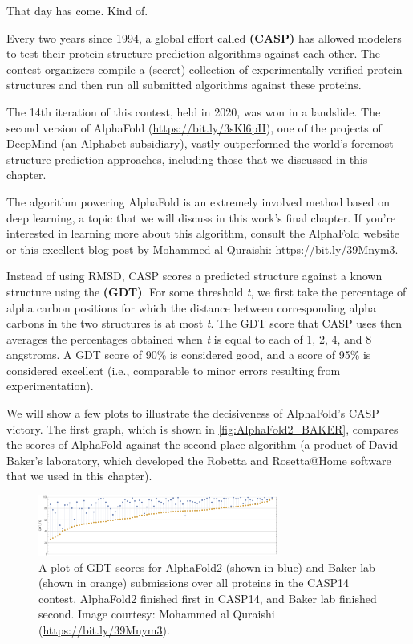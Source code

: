 That day has come. Kind of.

Every two years since 1994, a global effort called  \textbf{(CASP)} has allowed modelers to test their protein structure prediction algorithms against each other. The contest organizers compile a (secret) collection of experimentally verified protein structures and then run all submitted algorithms against these proteins.

The 14th iteration of this contest, held in 2020, was won in a landslide. The second version of AlphaFold (\url{https://bit.ly/3sKl6pH}), one of the projects of DeepMind (an Alphabet subsidiary), vastly outperformed the world's foremost structure prediction approaches, including those that we discussed in this chapter.

The algorithm powering AlphaFold is an extremely involved method based on deep learning, a topic that we will discuss in this work's final chapter. If you're interested in learning more about this algorithm, consult the AlphaFold website or this excellent blog post by Mohammed al Quraishi: \url{https://bit.ly/39Mnym3}.

Instead of using RMSD, CASP scores a predicted structure against a known structure using the  \textbf{(GDT)}. For some threshold \textit{t}, we first take the percentage of alpha carbon positions for which the distance between corresponding alpha carbons in the two structures is at most \textit{t}. The GDT score that CASP uses then averages the percentages obtained when \textit{t} is equal to each of 1, 2, 4, and 8 angstroms. A GDT score of 90\% is considered good, and a score of 95\% is considered excellent (i.e., comparable to minor errors resulting from experimentation).

We will show a few plots to illustrate the decisiveness of AlphaFold's CASP victory. The first graph, which is shown in \autoref{fig:AlphaFold2_BAKER}, compares the scores of AlphaFold against the second-place algorithm (a product of David Baker's laboratory, which developed the Robetta and Rosetta@Home software that we used in this chapter).

\begin{figure}[h]
	\centering
	\mySfFamily
	\includegraphics[width = 0.7\textwidth]{../images/AlphaFold2_BAKER.png}
	\caption{A plot of GDT scores for AlphaFold2 (shown in blue) and Baker lab (shown in orange) submissions over all proteins in the CASP14 contest. AlphaFold2 finished first in CASP14, and Baker lab finished second. Image courtesy: Mohammed al Quraishi (\url{https://bit.ly/39Mnym3}).}
	\label{fig:AlphaFold2_BAKER}
\end{figure}

